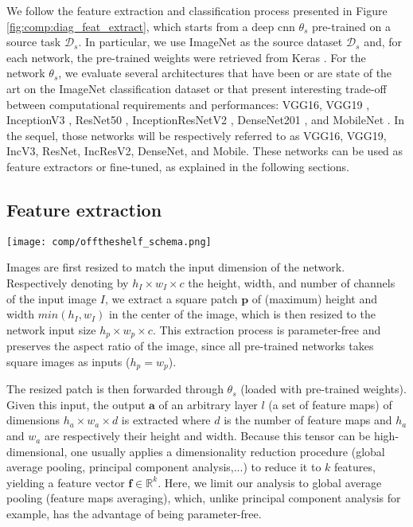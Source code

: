 We follow the feature extraction and classification process presented in Figure \ref{fig:comp:diag_feat_extract}, which starts from a deep \acrlong{cnn} $\theta_s$ pre-trained on a source task $\mathcal{D}_s$. In particular, we use ImageNet as the source dataset $\mathcal{D}_s$ and, for each network, the pre-trained weights were retrieved from Keras \cite{chollet2015keras}. For the network $\theta_s$, we evaluate several architectures that have been or are state of the art on the ImageNet classification dataset \cite{deng2009imagenet} or that present interesting trade-off between computational requirements and performances: VGG16, VGG19 \cite{simonyan2014very}, InceptionV3 \cite{szegedy2016rethinking}, ResNet50 \cite{he2016deep}, InceptionResNetV2 \cite{szegedy2017inception}, DenseNet201 \cite{huang2017densely}, and MobileNet \cite{howard2017mobilenets}. In the sequel, those networks will be respectively referred to as VGG16, VGG19, IncV3, ResNet, IncResV2, DenseNet, and Mobile. These networks can be used as feature extractors or fine-tuned, as explained in the following sections.

\subsection{Feature extraction}
\label{ssec:comp:feature_extr}

\begin{figure*}
    \center
    \texttt{[image: comp/offtheshelf\_schema.png]}
    \caption{Feature extraction from pre-trained convolutional neural networks}
    \label{fig:comp:diag_feat_extract}
\end{figure*}

Images are first resized to match the input dimension of the network. Respectively denoting by $h_I \times w_I \times c$ the height, width, and number of channels of the input image $I$, we extract a square patch $\mathbf{p}$ of (maximum) height and width $min\left(h_I, w_I\right)$ in the center of the image, which is then resized to the network input size $h_p\times w_p\times c$. This extraction process is parameter-free and preserves the aspect ratio of the image, since all pre-trained networks takes square images as inputs (\ie $h_p=w_p$).

The resized patch is then forwarded through $\theta_s$ (loaded with pre-trained weights). Given this input, the output $\mathbf{a}$ of an arbitrary layer $l$ (\ie a set of feature maps) of dimensions $h_a \times w_a \times d$ is extracted where $d$ is the number of feature maps and $h_a$ and $w_a$ are respectively their height and width. Because this tensor can be high-dimensional, one usually applies a dimensionality reduction procedure (\eg global average pooling, principal component analysis,...) to reduce it to $k$ features, yielding a feature vector $\mathbf{f}\in \mathbb{R}^k$.  Here, we limit our analysis to global average pooling (\ie feature maps averaging), which, unlike principal component analysis for example, has the advantage of being parameter-free.

